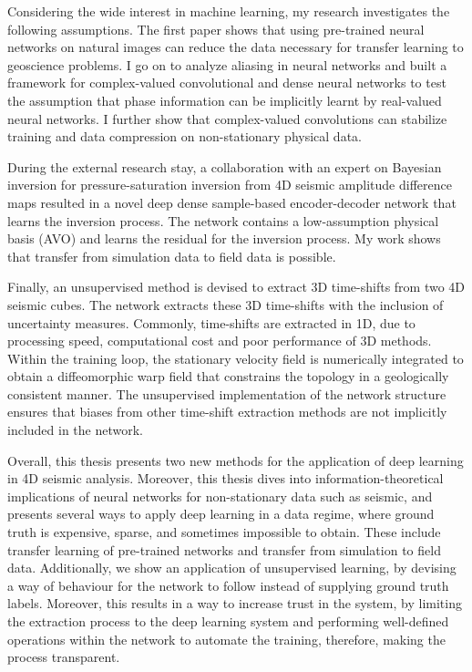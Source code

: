 Considering the wide interest in machine learning, my research investigates the following assumptions. The first paper shows that using pre-trained neural networks on natural images can reduce the data necessary for transfer learning to geoscience problems. I go on to analyze aliasing in neural networks and built a framework for complex-valued convolutional and dense neural networks to test the assumption that phase information can be implicitly learnt by real-valued neural networks. I further show that complex-valued convolutions can stabilize training and data compression on non-stationary physical data.

During the external research stay, a collaboration with an expert on Bayesian inversion for pressure-saturation inversion from 4D seismic amplitude difference maps resulted in a novel deep dense sample-based encoder-decoder network that learns the inversion process. The network contains a low-assumption physical basis (AVO) and learns the residual for the inversion process. My work shows that transfer from simulation data to field data is possible.

Finally, an unsupervised method is devised to extract 3D time-shifts from two 4D seismic cubes. The network extracts these 3D time-shifts with the inclusion of uncertainty measures. Commonly, time-shifts are extracted in 1D, due to processing speed, computational cost and poor performance of 3D methods. Within the training loop, the stationary velocity field is numerically integrated to obtain a diffeomorphic warp field that constrains the topology in a geologically consistent manner. The unsupervised implementation of the network structure ensures that biases from other time-shift extraction methods are not implicitly included in the network.

Overall, this thesis presents two new methods for the application of deep learning in 4D seismic analysis. Moreover, this thesis dives into information-theoretical implications of neural networks for non-stationary data such as seismic, and presents several ways to apply deep learning in a data regime, where ground truth is expensive, sparse, and sometimes impossible to obtain. These include transfer learning of pre-trained networks and transfer from simulation to field data. Additionally, we show an application of unsupervised learning, by devising a way of behaviour for the network to follow instead of supplying ground truth labels. Moreover, this results in a way to increase trust in the system, by limiting the extraction process to the deep learning system and performing well-defined operations within the network to automate the training, therefore, making the process transparent.


